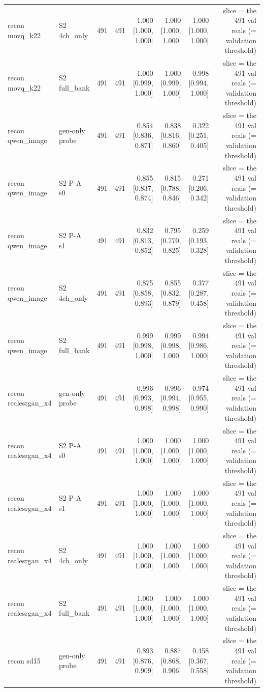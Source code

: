 \begin{table}[htbp]
\begin{tabular}{llrrrrrrr}
recon movq\_k22 & S2 4ch\_only & 491 & 491 & 1.000 [1.000, 1.000] & 1.000 [1.000, 1.000] & 1.000 [1.000, 1.000] &  & slice = the 491 val reals (= validation threshold) \\
recon movq\_k22 & S2 full\_bank & 491 & 491 & 1.000 [0.999, 1.000] & 1.000 [0.999, 1.000] & 0.998 [0.994, 1.000] &  & slice = the 491 val reals (= validation threshold) \\
recon qwen\_image & gen-only probe & 491 & 491 & 0.854 [0.836, 0.871] & 0.838 [0.816, 0.860] & 0.322 [0.251, 0.405] &  & slice = the 491 val reals (= validation threshold) \\
recon qwen\_image & S2 P-A s0 & 491 & 491 & 0.855 [0.837, 0.874] & 0.815 [0.788, 0.846] & 0.271 [0.206, 0.342] &  & slice = the 491 val reals (= validation threshold) \\
recon qwen\_image & S2 P-A s1 & 491 & 491 & 0.832 [0.813, 0.852] & 0.795 [0.770, 0.825] & 0.259 [0.193, 0.328] &  & slice = the 491 val reals (= validation threshold) \\
recon qwen\_image & S2 4ch\_only & 491 & 491 & 0.875 [0.858, 0.893] & 0.855 [0.832, 0.879] & 0.377 [0.287, 0.458] &  & slice = the 491 val reals (= validation threshold) \\
recon qwen\_image & S2 full\_bank & 491 & 491 & 0.999 [0.998, 1.000] & 0.999 [0.998, 1.000] & 0.994 [0.986, 1.000] &  & slice = the 491 val reals (= validation threshold) \\
recon realesrgan\_x4 & gen-only probe & 491 & 491 & 0.996 [0.993, 0.998] & 0.996 [0.994, 0.998] & 0.974 [0.955, 0.990] &  & slice = the 491 val reals (= validation threshold) \\
recon realesrgan\_x4 & S2 P-A s0 & 491 & 491 & 1.000 [1.000, 1.000] & 1.000 [1.000, 1.000] & 1.000 [1.000, 1.000] &  & slice = the 491 val reals (= validation threshold) \\
recon realesrgan\_x4 & S2 P-A s1 & 491 & 491 & 1.000 [1.000, 1.000] & 1.000 [1.000, 1.000] & 1.000 [1.000, 1.000] &  & slice = the 491 val reals (= validation threshold) \\
recon realesrgan\_x4 & S2 4ch\_only & 491 & 491 & 1.000 [1.000, 1.000] & 1.000 [1.000, 1.000] & 1.000 [1.000, 1.000] &  & slice = the 491 val reals (= validation threshold) \\
recon realesrgan\_x4 & S2 full\_bank & 491 & 491 & 1.000 [1.000, 1.000] & 1.000 [1.000, 1.000] & 1.000 [1.000, 1.000] &  & slice = the 491 val reals (= validation threshold) \\
recon sd15 & gen-only probe & 491 & 491 & 0.893 [0.876, 0.909] & 0.887 [0.868, 0.906] & 0.458 [0.367, 0.558] &  & slice = the 491 val reals (= validation threshold) \\

\end{tabular}
\end{table}
